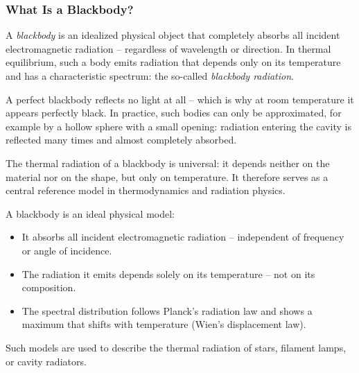 \subsubsection{What Is a Blackbody?}

A \emph{blackbody} is an idealized physical object that completely absorbs all incident electromagnetic radiation – regardless of wavelength or direction. In thermal equilibrium, such a body emits radiation that depends only on its temperature and has a characteristic spectrum: the so-called \emph{blackbody radiation}.

A perfect blackbody reflects no light at all – which is why at room temperature it appears perfectly black. In practice, such bodies can only be approximated, for example by a hollow sphere with a small opening: radiation entering the cavity is reflected many times and almost completely absorbed.

The thermal radiation of a blackbody is universal: it depends neither on the material nor on the shape, but only on temperature. It therefore serves as a central reference model in thermodynamics and radiation physics.
\newpage
\noindent
\vspace{1em}
\begin{tcolorbox}[colback=blue!5!white, colframe=blue!50!black, title=What Is a Blackbody?]
	\label{box:schwarzerkoerper}
	A blackbody is an ideal physical model:
	
	\begin{itemize}
		\item It absorbs all incident electromagnetic radiation – independent of frequency or angle of incidence.
		\item The radiation it emits depends solely on its temperature – not on its composition.
		\item The spectral distribution follows Planck’s radiation law and shows a maximum that shifts with temperature (Wien’s displacement law).
	\end{itemize}
	
	Such models are used to describe the thermal radiation of stars, filament lamps, or cavity radiators.
\end{tcolorbox}

